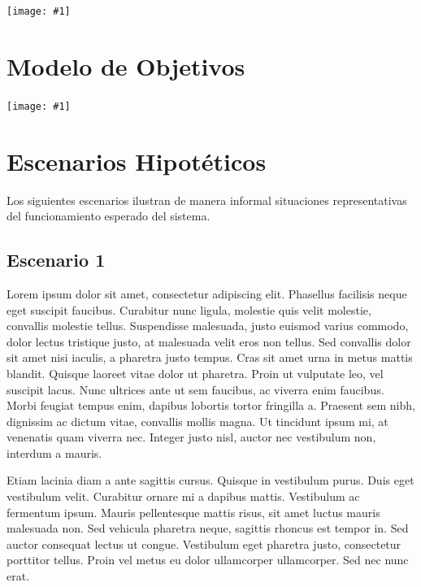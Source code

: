 \documentclass[a4paper, 10pt, twoside]{article}
\newcommand{\diagrama}[1]{
  \texttt{[image: \#1]}
}
\begin{document}
\diagrama{diagrama-de-contexto.png}




\section{Modelo de Objetivos}

\diagrama{modelo-de-objetivos.jpg}




\section{Escenarios Hipotéticos}


Los siguientes escenarios ilustran de manera informal situaciones representativas del funcionamiento esperado del sistema.


\subsection{Escenario 1}

Lorem ipsum dolor sit amet, consectetur adipiscing elit. Phasellus facilisis neque eget suscipit faucibus. Curabitur nunc ligula, molestie quis velit molestie, convallis molestie tellus. Suspendisse malesuada, justo euismod varius commodo, dolor lectus tristique justo, at malesuada velit eros non tellus. Sed convallis dolor sit amet nisi iaculis, a pharetra justo tempus. Cras sit amet urna in metus mattis blandit. Quisque laoreet vitae dolor ut pharetra. Proin ut vulputate leo, vel suscipit lacus. Nunc ultrices ante ut sem faucibus, ac viverra enim faucibus. Morbi feugiat tempus enim, dapibus lobortis tortor fringilla a. Praesent sem nibh, dignissim ac dictum vitae, convallis mollis magna. Ut tincidunt ipsum mi, at venenatis quam viverra nec. Integer justo nisl, auctor nec vestibulum non, interdum a mauris.

Etiam lacinia diam a ante sagittis cursus. Quisque in vestibulum purus. Duis eget vestibulum velit. Curabitur ornare mi a dapibus mattis. Vestibulum ac fermentum ipsum. Mauris pellentesque mattis risus, sit amet luctus mauris malesuada non. Sed vehicula pharetra neque, sagittis rhoncus est tempor in. Sed auctor consequat lectus ut congue. Vestibulum eget pharetra justo, consectetur porttitor tellus. Proin vel metus eu dolor ullamcorper ullamcorper. Sed nec nunc erat.
\end{document}

